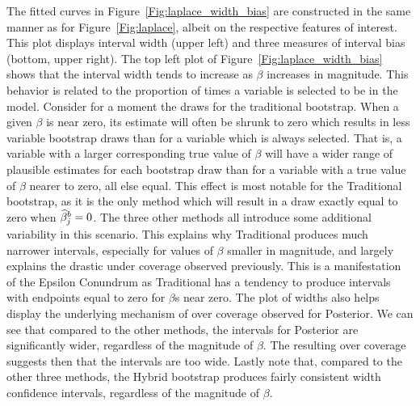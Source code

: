 The fitted curves in Figure~\ref{Fig:laplace_width_bias} are constructed in the same manner as for Figure~\ref{Fig:laplace}, albeit on the respective features of interest. This plot displays interval width (upper left) and three measures of interval bias (bottom, upper right). The top left plot of Figure~\ref{Fig:laplace_width_bias} shows that the interval width tends to increase as $\beta$ increases in magnitude. This behavior is related to the proportion of times a variable is selected to be in the model. Consider for a moment the draws for the traditional bootstrap. When a given $\beta$ is near zero, its estimate will often be shrunk to zero which results in less variable bootstrap draws than for a variable which is always selected. That is, a variable with a larger corresponding true value of $\beta$ will have a wider range of plausible estimates for each bootstrap draw than for a variable with a true value of $\beta$ nearer to zero, all else equal. This effect is most notable for the Traditional bootstrap, as it is the only method which will result in a draw exactly equal to zero when $\widehat{\beta}^b_j = 0$. The three other methods all introduce some additional variability in this scenario. This explains why Traditional produces much narrower intervals, especially for values of $\beta$ smaller in magnitude, and largely explains the drastic under coverage observed previously. This is a manifestation of the Epsilon Conundrum as Traditional has a tendency to produce intervals with endpoints equal to zero for $\beta$s near zero. The plot of widths also helps display the underlying mechanism of over coverage observed for Posterior. We can see that compared to the other methods, the intervals for Posterior are significantly wider, regardless of the magnitude of $\beta$. The resulting over coverage suggests then that the intervals are too wide. Lastly note that, compared to the other three methods, the Hybrid bootstrap produces fairly consistent width confidence intervals, regardless of the magnitude of $\beta$.

